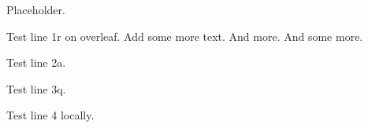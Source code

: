 

Placeholder.

Test line 1r on overleaf. Add some more text. And more.
And some more.

Test line 2a.

Test line 3q.

Test line 4 locally.

